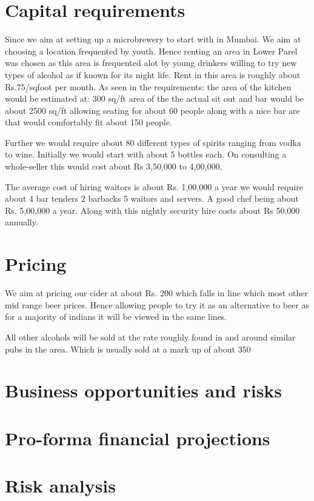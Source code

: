 \documentclass{article}
\begin{document}

\section{Capital requirements}

Since we aim at setting up a microbrewery to start with in Mumbai. We aim at choosing a location frequented by youth.
Hence renting an area in Lower Parel was chosen as this area is frequented alot by young drinkers willing to try new types of alcohol as if known for its night life.
Rent in this area is roughly about Rs.75/sqfoot per month. 
As seen in the requirements:
the area of the kitchen would be estimated at: 300 sq/ft
area of the the actual sit out and bar would be about 2500 sq/ft allowing seating for about 60 people along with a nice bar are that would comfortably fit about 150 people. 

Further we would require about 80 different types of spirits ranging from vodka to wine. Initially we would start with about 5 bottles each. On consulting a whole-seller this would cost about Rs 3,50,000 to 4,00,000.

The average cost of hiring waitors is about Rs. 1,00,000 a year we would require about 4 bar tenders 2 barbacks 5 waitors and servers.  
A good chef being about Rs. 5,00,000 a year.
Along with this nightly security hire costs about Rs 50,000 annually.



\section{Pricing}
We aim at pricing our cider at about Rs. 200 which falls in line which most other mid range beer prices. Hence allowing people to try it as an alternative to beer as for a majority of indians it will be viewed in the same lines.

All other alcohols will be sold at the rate roughly found in and around similar pubs in the area. Which is usually sold at a mark up of about 350%




\section{Business opportunities and risks}
\section{Pro-forma financial projections}
\section{Risk analysis}
\end{document}

